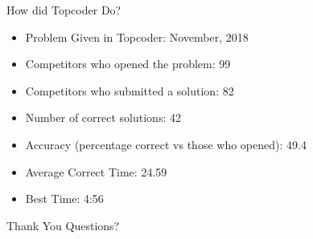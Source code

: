 \documentclass[10pt]{beamer}
\begin{document}
\begin{frame}{How did Topcoder Do?}
  \begin{itemize}
    \item Problem Given in Topcoder: November, 2018
    \item Competitors who opened the problem: 99
    \item Competitors who submitted a solution: 82
    \item Number of correct solutions: 42
    \item Accuracy (percentage correct vs those who opened): 49.4%
    \item Average Correct Time: 24.59
    \item Best Time: 4:56
  \end{itemize}
\end{frame}

\begin{frame}{Thank You}
  \Huge Questions?
\end{frame}
\end{document}
